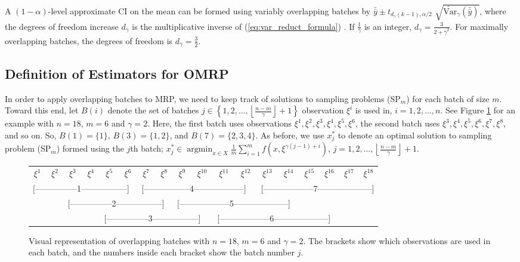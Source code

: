 \documentclass[12pt]{article}
\newcommand{\vartg}[1]{\widetilde{\mathrm{Var}}_\gamma \left( #1 \right)}
\newcommand{\x}{x}
\newcommand{\xs}{\x^*}
\newcommand{\xit}{\xi}
\newcommand{\xiti}{\xit^i}
\newcommand{\nb}{\left\lfloor\tfrac{n-m}{\gamma}\right\rfloor+1}
\newcommand{\gammab}{\bar{\gamma}}
\newcommand{\ogb}{\tfrac{1}{\gammab}}
\newcommand{\yb}{\bar{y}}
\newcommand{\ybb}{\bar{\yb}}
\DeclareMathOperator*{\argmin}{argmin}
\begin{document}
A $(1-\alpha)$-level approximate CI on the mean can be formed using variably overlapping batches by $\ybb \pm t_{d_{\gamma}(k-1),\alpha/2}$ $\sqrt{\vartg{\ybb}}$, where the degrees of freedom increase $d_{\gamma}$ is the multiplicative inverse of (\ref{eq:var_reduct_formula}) \citep{Welch1987}.  
If $\ogb$ is an integer, $d_{\gamma} = \frac{3}{2+\gammab^2}$.  For maximally overlapping batches, the degrees of freedom is $d_{\gamma} = \frac{3}{2}$.
 

\subsection{Definition of Estimators for OMRP}
In order to apply overlapping batches to MRP, we need to keep track of solutions to sampling problems (SP$_m$) for each batch of size $m$.  
Toward this end, let $B(i)$ denote the set of batches $j \in \left\{1, 2, \dots, \nb \right\}$ observation $\xiti$ is used in, $i = 1, 2, \dots, n$.  
See Figure \ref{fig:overlap_nonint} for an example with $n=18$, $m = 6$ and $\gamma = 2$.  
Here, the first batch uses observations $\xit^1, \xit^2, \xit^3, \xit^4, \xit^5, \xit^6$, the second batch uses $\xit^3, \xit^4, \xit^5, \xit^6, \xit^7, \xit^8$, and so on.  
So, $B(1) = \{1\}$, $B(3) = \{1,2\}$, and $B(7)=\{2,3,4\}$.  
As before, we use $\xs_j$ to denote an optimal solution to sampling problem (SP$_m$) formed using the $j$th batch; $\xs_j \in \argmin_{\x \in X} \frac{1}{m} \sum_{i=1}^m f(\x,\xit^{\gamma(j-1) + i})$, $j = 1, 2, \dots, \nb$.

\begin{figure}[htb!]
	\centering
	\begin{tabular}{*{18}{c}}
		$\xit^1$ & $\xit^2$ & $\xit^3$ & $\xit^4$ & $\xit^5$ & $\xit^6$ & $\xit^7$ & $\xit^8$ & $\xit^9$ & $\xit^{10}$ & $\xit^{11}$ & $\xit^{12}$ & $\xit^{13}$ & $\xit^{14}$ & $\xit^{15}$ & $\xit^{16}$ & $\xit^{17}$  & $\xit^{18}$ \\
		\multicolumn{6}{l}{[---------------1-----------------]} &
		\multicolumn{6}{l}{[-----------------4------------------]} &
		\multicolumn{6}{l}{[------------------7--------------------]} \\
		& & \multicolumn{6}{l}{[---------------2-----------------]} &
		\multicolumn{6}{l}{[------------------5--------------------]} \\
		& & & & \multicolumn{6}{l}{[---------------3-----------------]} &
		\multicolumn{6}{l}{[------------------6--------------------]} \\
	\end{tabular}
	\caption{Visual representation of overlapping batches with $n = 18$, $m = 6$ and $\gamma = 2$.  
        The brackets show which observations are used in each batch, and the numbers inside each bracket show the batch number $j$.}
	\label{fig:overlap_nonint}
\end{figure}
\end{document}
